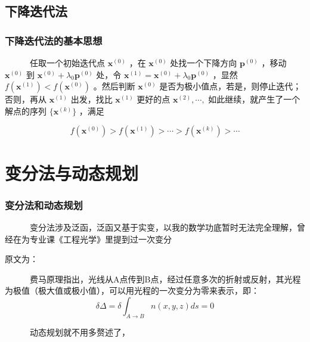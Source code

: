 \documentclass[slidestop,compress,mathserif,c]{beamer}
\begin{document}
\subsection{\hfill 下降迭代法}
\begin{frame}
\frametitle{下降迭代法的基本思想}
~~~~~~任取一个初始迭代点
 $ \mathbf{x}^{(0)} $ ，在
 $ \mathbf{x}^{(0)} $ 处找一个下降方向
 $ \mathbf{p}^{(0)} $ ，移动
 $ \mathbf{x}^{(0)} $ 到
 $ \mathbf{x}^{(0)}+\lambda_0\mathbf{p}^{(0)} $ 处，令
 $ \mathbf{x}^{(1)}=\mathbf{x}^{(0)}+\lambda_0\mathbf{p}^{(0)} $ ，显然
 $ f(\mathbf{x}^{(1)})<f(\mathbf{x}^{(0)}) $ 。然后判断
 $ \mathbf{x}^{(0)} $ 是否为极小值点，若是，则停止迭代；否则，再从
 $ \mathbf{x}^{(1)} $ 出发，找比
 $ \mathbf{x}^{(1)} $ 更好的点
 $ \mathbf{x}^{(2)},\cdots, $ 如此继续，就产生了一个解点的序列
 $ \{\mathbf{x}^{(k)}\} $ ，满足

 $$ f(\mathbf{x}^{(0)})>f(\mathbf{x}^{(1)})>\cdots>f(\mathbf{x}^{(k)})>\cdots $$ 

\end{frame}

\section{变分法与动态规划}

\begin{frame}
\frametitle{变分法和动态规划}
~~~~~~变分法涉及泛函，泛函又基于实变，以我的数学功底暂时无法完全理解，曾经在为专业课《工程光学》里提到过一次变分

原文为：

~~~~~~费马原理指出，光线从A点传到B点，经过任意多次的折射或反射，其光程为极值（极大值或极小值），可以用光程的一次变分为零来表示，即：
 $$ \delta\Delta=\delta\int_{A\to B}n(x,y,z)ds=0 $$ 

~~~~~~动态规划就不用多赘述了，

\end{frame}




\end{document}
